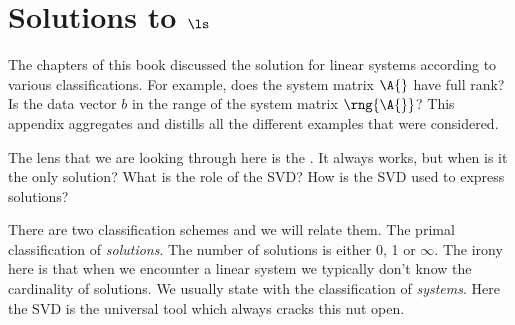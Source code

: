 \section{Solutions to $\ls$}

The chapters of this book discussed the solution for linear systems according to various classifications. For example, does the system matrix $\A{}$ have full rank? Is the data vector $b$ in the range of the system matrix $\rng{\A{}}$? This appendix aggregates and distills all the different examples that were considered.

The lens that we are looking through here is the \svdp. It always works, but when is it the only solution? What is the role of the SVD? How is the SVD used to express solutions?

There are two classification schemes and we will relate them. The primal classification of \textit{solutions}. The number of solutions is either 0, 1 or $\infty$. The irony here is that when we encounter a linear system we typically don't know the cardinality of solutions. We usually state with the classification of \textit{systems}. Here the SVD is the universal tool which always cracks this nut open. 

